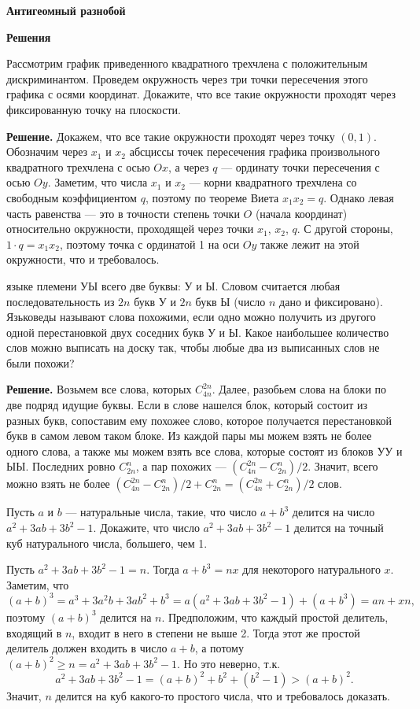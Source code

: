 \centerline{\bf \Huge Антигеомный разнобой}
\centerline{\bf \Huge Решения}

Рассмотрим график приведенного квадратного трехчлена с положительным
дискриминантом. Проведем окружность через три точки пересечения этого
графика с осями координат. Докажите, что все такие окружности проходят
через фиксированную точку на плоскости.

\textbf{Решение.}
Докажем, что все такие окружности проходят через точку $(0,1)$.
Обозначим через $x_1$ и $x_2$ абсциссы точек пересечения графика
произвольного квадратного трехчлена с осью $Ox$, а через $q$ — ординату
точки пересечения с осью $Oy$. Заметим, что числа $x_1$ и $x_2$ — корни
квадратного трехчлена со свободным коэффициентом $q$, поэтому по теореме
Виета $x_1x_2=q$. Однако левая часть равенства — это в точности степень
точки $O$ (начала координат) относительно окружности, проходящей через
точки $x_1$, $x_2$, $q$. С другой стороны, $1\cdot q=x_1x_2$, поэтому
точка с ординатой 1 на оси $Oy$ также лежит на этой окружности, что и
требовалось.

 языке племени УЫ всего две буквы: У и Ы. Словом считается любая
последовательность из $2 n$ букв У и $2 n$ букв Ы (число $n$ дано и
фиксировано). Язьковеды называют слова похожими, если одно можно
получить из другого одной перестановкой двух соседних букв У и Ы. Какое
наибольшее количество слов можно выписать на доску так, чтобы любые два
из выписанных слов не были похожи?

\textbf{Решение.}
Возьмем все слова, которых $C_{4n}^{2n}$. Далее, разобьем слова на блоки
по две подряд идущие буквы. Если в слове нашелся блок, который состоит
из разных букв, сопоставим ему похожее слово, которое получается
перестановкой букв в самом левом таком блоке. Из каждой пары мы можем
взять не более одного слова, а также мы можем взять все слова, которые
состоят из блоков УУ и ЫЫ. Последних ровно $C_{2n}^n$, а пар похожих —
$(C_{4n}^{2n}-C_{2n}^n)/2$. Значит, всего можно взять не более
$(C_{4n}^{2n}-C_{2n}^n)/2+C_{2n}^n=(C_{4n}^{2n}+C_{2n}^n)/2$ слов.

Пусть $a$ и $b$ — натуральные числа, такие, что число $a+b^3$ делится на
число $a^2+3ab+3b^2-1$. Докажите, что число $a^2+3ab+3b^2-1$ делится на
точный куб натурального числа, большего, чем 1.

Пусть $a^2+3ab+3b^2-1=n$. Тогда $a+b^3=nx$ для некоторого натурального
$x$. Заметим, что
$$(a+b)^3=a^3+3a^2b+3ab^2+b^3=a(a^2+3ab+3b^2-1)+(a+b^3)=an+xn,$$ поэтому
$(a+b)^3$ делится на $n$. Предположим, что каждый простой делитель,
входящий в $n$, входит в него в степени не выше 2. Тогда этот же простой
делитель должен входить в число $a+b$, а потому
$(a+b)^2\geq n=a^2+3ab+3b^2-1$. Но это неверно, т.к.
$$a^2+3ab+3b^2-1=(a+b)^2+b^2+(b^2-1)> (a+b)^2.$$ Значит, $n$ делится на
куб какого-то простого числа, что и требовалось доказать.

